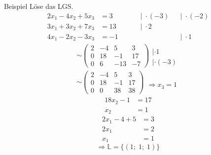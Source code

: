 \documentclass{article}
\begin{document}
\begin{boxx}[DarkBlue]{Beispiel}
    Löse das LGS.
    \begin{align*}
        &&&&2x_1 - 4x_2 + 5x_3 &= 3 &&&&|\; \cdot (-3) &&|\; \cdot (-2) &&&&\\
        &&&&3x_1 + 3x_2 + 7x_3 &= 13 &&&&|\; \cdot 2 &&&&\\
        &&&&4x_1 - 2x_2 - 3x_3 &= -1 &&&&&&|\; \cdot 1&&&&
    \end{align*}
    \begin{align*}
        &\sim \left( \begin{array}{ccc|c} 2 & -4 & 5 & 3 \\ 0 & 18 & -1  & 17 \\ 0 & 6 & -13 & -7 \end{array} \right) \begin{array}{ll}
             &  \\
             |\cdot 1& \\
             |\cdot (-3)&
        \end{array} \\
        &\sim \left( \begin{array}{ccc|c} 2 & -4 & 5 & 3 \\ 0 & 18 & -1  & 17 \\ 0 & 0 & 38 & 38 \end{array} \right) \begin{array}{ll}
             &  \\
             & \\
             \Rightarrow x_3 = 1&
        \end{array} 
    \end{align*}
    \begin{align*}
        18x_2 - 1 &= 17 \\
        x_2 &= 1
    \end{align*}
    \begin{align*}
        2x_1 - 4 + 5 &= 3 \\
        2x_1 &= 2 \\
        x_1 &= 1
    \end{align*}
    \[\Rightarrow \mathbb{L} = \lbrace(1;\;1;\;1)\rbrace\]
\end{boxx}
\newpage
\end{document}
